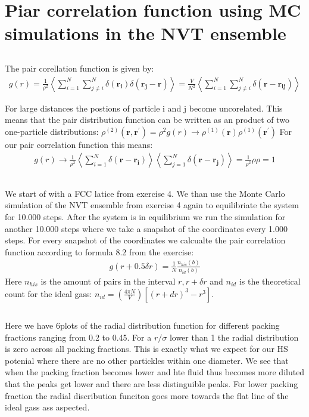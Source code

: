 \section{Piar correlation function using MC simulations in the NVT ensemble}
\subsection{}
The pair corellation function is given by:
\begin{align*}
    g(r)= \frac{1}{\rho^2} \left\langle \sum_{i =1}^{N} \sum_{j \neq i}^{N} \delta(\mathbf{r_i})\delta(\mathbf{r_j - r})\right\rangle = \frac{V}{N^2} \left\langle \sum_{i =1}^{N} \sum_{j \neq i}^{N} \delta(\mathbf{r - r_{ij}})\right\rangle
\end{align*}

For large distances the postions of particle i and j become uncorelated. This means that the pair distribution function can be written as an product of two one-particle distributions: $\rho^{(2)}(\mathbf{r,r^{'}}) = \rho^2 g(r) \rightarrow \rho^{(1)}(\mathbf{r})\rho^{(1)}(\mathbf{r^{'}})$ For our pair correlation function this means:
\begin{align*}
    g(r) \rightarrow \frac{1}{\rho^2} \left\langle \sum_{i =1}^{N}\delta(\mathbf{r-r_i})\right\rangle \left\langle \sum_{j =1}^{N}\delta(\mathbf{r-r_j})\right\rangle = \frac{1}{\rho^2} \rho \rho = 1
\end{align*}
\subsection{}
We start of with a FCC latice from exercise 4. 
We than use the Monte Carlo simulation of the NVT ensemble from exercise 4 again to equilibriate the system for 10.000 steps. 
After the system is in equilibrium we run the simulation for another 10.000 steps where we take a snapshot of the coordinates every 1.000 steps. 
For every snapshot of the coordinates we calcualte the pair correlation function according to formula 8.2 from the exercise:
\begin{align*}
    g(r + 0.5\delta r) = \frac{1}{N} \frac{n_{his}(b)}{n_{id}(b)}
\end{align*}
Here $n_{his}$ is the amount of pairs in the interval $r, r + \delta r$ and $n_{id}$ is the theoretical count for the ideal gass: $n_{id} = \left(\frac{4 \pi N}{V} \right)\left[\left(r + dr \right)^3 -r^3 \right]$.

\subsection{}
Here we have 6plots of the radial distribution function for different packing fractions ranging from 0.2 to 0.45.
For a $ r/\sigma $ lower than 1 the radial distribution is zero across all packing fractions. This is exactly what we expect for our HS potenial where there are no other partickles within one diameter.
 We see that when the packing fraction becomes lower and hte fluid thus becomes more diluted that the peaks get lower and there are less distinguible peaks.
 For lower packing fraction the radial discribution funciton goes more towards the flat line of the ideal gass ass aspected.

